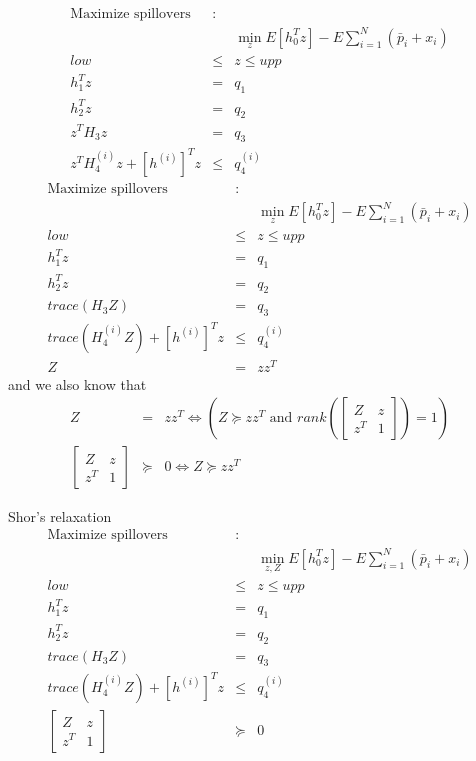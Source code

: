 \documentclass{article}
\begin{document}
\begin{eqnarray*}
\text{Maximize spillovers} &\text{:}& \\
&&\min_{z}E\left[ h_{0}^{T}z\right] -E\sum_{i=1}^{N}\left( \bar{p}%
_{i}+x_{i}\right)  \\
low &\leq &z\leq upp \\
h_{1}^{T}z &=&q_{1} \\
h_{2}^{T}z &=&q_{2} \\
z^{T}H_{3}z &=&q_{3} \\
z^{T}H_{4}^{\left( i\right) }z+\left[ h^{\left( i\right) }\right] ^{T}z
&\leq &q_{4}^{\left( i\right) }
\end{eqnarray*}%
\begin{eqnarray*}
\text{Maximize spillovers} &\text{:}& \\
&&\min_{z}E\left[ h_{0}^{T}z\right] -E\sum_{i=1}^{N}\left( \bar{p}%
_{i}+x_{i}\right)  \\
low &\leq &z\leq upp \\
h_{1}^{T}z &=&q_{1} \\
h_{2}^{T}z &=&q_{2} \\
trace\left( H_{3}Z\right)  &=&q_{3} \\
trace\left( H_{4}^{\left( i\right) }Z\right) +\left[ h^{\left( i\right) }%
\right] ^{T}z &\leq &q_{4}^{\left( i\right) } \\
Z &=&zz^{T}
\end{eqnarray*}%
and we also know that%
\begin{eqnarray*}
Z &=&zz^{T}\iff \left( Z\succeq zz^{T}\text{ and }rank\left( \left[ 
\begin{array}{cc}
Z & z \\ 
z^{T} & 1%
\end{array}%
\right] \right) =1\right)  \\
\left[ 
\begin{array}{cc}
Z & z \\ 
z^{T} & 1%
\end{array}%
\right]  &\succeq &0\iff Z\succeq zz^{T}
\end{eqnarray*}

Shor's relaxation%
\begin{eqnarray*}
\text{Maximize spillovers} &\text{:}& \\
&&\min_{z,Z}E\left[ h_{0}^{T}z\right] -E\sum_{i=1}^{N}\left( \bar{p}%
_{i}+x_{i}\right) \\
low &\leq &z\leq upp \\
h_{1}^{T}z &=&q_{1} \\
h_{2}^{T}z &=&q_{2} \\
trace\left( H_{3}Z\right) &=&q_{3} \\
trace\left( H_{4}^{\left( i\right) }Z\right) +\left[ h^{\left( i\right) }%
\right] ^{T}z &\leq &q_{4}^{\left( i\right) } \\
\left[ 
\begin{array}{cc}
Z & z \\ 
z^{T} & 1%
\end{array}%
\right] &\succeq &0
\end{eqnarray*}
\end{document}
